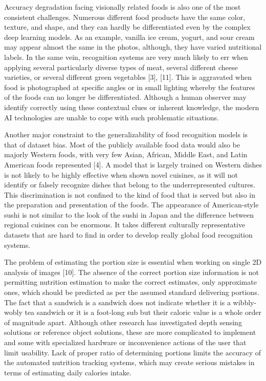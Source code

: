 \documentclass[12pt, openany]{report}
\begin{document}
Accuracy degradation facing visionally related foods is also one of the most consistent challenges. Numerous different food products have the same color, texture, and shape, and they can hardly be differentiated even by the complex deep learning models. As an example, vanilla ice cream, yogurt, and sour cream may appear almost the same in the photos, although, they have varied nutritional labels. In the same vein, recognition systems are very much likely to err when applying several particularly diverse types of meat, several different cheese varieties, or several different green vegetables [3], [11]. This is aggravated when food is photographed at specific angles or in small lighting whereby the features of the foods can no longer be differentiated. Although a human observer may identify correctly using these contextual clues or inherent knowledge, the modern AI technologies are unable to cope with such problematic situations.

Another major constraint to the generalizability of food recognition models is that of dataset bias. Most of the publicly available food data would also be majorly Western foods, with very few Asian, African, Middle East, and Latin American foods represented [4]. A model that is largely trained on Western dishes is not likely to be highly effective when shown novel cuisines, as it will not identify or falsely recognize dishes that belong to the underrepresented cultures. This discrimination is not confined to the kind of food that is served but also in the preparation and presentation of the foods. The appearance of American-style sushi is not similar to the look of the sushi in Japan and the difference between regional cuisines can be enormous. It takes different culturally representative datasets that are hard to find in order to develop really global food recognition systems.

The problem of estimating the portion size is essential when working on single 2D analysis of images [10]. The absence of the correct portion size information is not permitting nutrition estimation to make the correct estimates, only approximate ones, which should be predicted as per the assumed standard delivering portions. The fact that a sandwich is a sandwich does not indicate whether it is a wibbly-wobly tea sandwich or it is a foot-long sub but their caloric value is a whole order of magnitude apart. Although other research has investigated depth sensing solutions or reference object solutions, these are more complicated to implement and some with specialized hardware or inconvenience actions of the user that limit usability. Lack of proper ratio of determining portions limits the accuracy of the automated nutrition tracking systems, which may create serious mistakes in terms of estimating daily calories intake.
\end{document}
